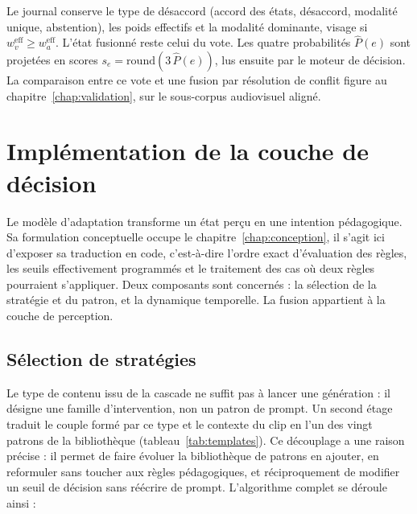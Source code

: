 Le journal conserve le type de désaccord (accord des états,
désaccord, modalité unique, abstention), les poids effectifs et la
modalité dominante, visage si $w_v^{\mathrm{eff}}\ge
w_a^{\mathrm{eff}}$. L'état fusionné reste celui du vote. Les quatre
probabilités $\hat{P}(e)$ sont projetées en scores
$s_e=\mathrm{round}(3\,\hat{P}(e))$, lus ensuite par le moteur de
décision. La comparaison entre ce vote et une fusion par résolution
de conflit figure au chapitre~\ref{chap:validation}, sur le
sous-corpus audiovisuel aligné.

\section{Implémentation de la couche de décision}
\label{sec:impl-modele}

Le modèle d'adaptation transforme un état perçu en une intention pédagogique. Sa
formulation conceptuelle occupe le chapitre~\ref{chap:conception}, 
il s'agit ici d'exposer sa traduction en code,
c'est-à-dire l'ordre exact d'évaluation des règles, les seuils effectivement
programmés et le traitement des cas où deux règles pourraient s'appliquer. Deux
composants sont concernés : la sélection de la stratégie et du patron, et
la dynamique temporelle. La fusion appartient à la couche de perception.


\subsection{Sélection de stratégies}
\label{subsec:impl-selection}

Le type de contenu issu de la cascade ne
suffit pas à lancer une génération : il désigne une famille d'intervention, non un
patron de prompt. Un second étage traduit le couple formé par ce type et le
contexte du clip en l'un des vingt patrons de la bibliothèque
(tableau~\ref{tab:templates}). Ce découplage a une raison précise : il permet de
faire évoluer la bibliothèque de patrons en ajouter, en reformuler
sans toucher aux règles pédagogiques, et réciproquement de modifier un
seuil de décision
sans réécrire de prompt. L'algorithme complet se déroule ainsi :


